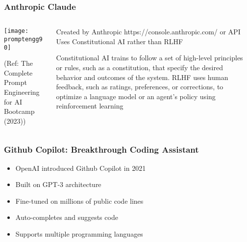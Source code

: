 



\begin{frame}[fragile]\frametitle{Anthropic Claude}


\begin{columns}
    \begin{column}[T]{0.6\linewidth}
		\begin{center}
		\texttt{[image: promptengg90]}

		{\tiny (Ref: The Complete Prompt Engineering for AI Bootcamp (2023))}
		\end{center}	
    \end{column}
    \begin{column}[T]{0.4\linewidth}
		Created by Anthropic 
		https://console.anthropic.com/ or API
		Uses Constitutional AI rather than RLHF
		
		Constitutional AI trains to follow a set of high-level principles or rules, such as a constitution, that specify the desired behavior and outcomes of the system.
		RLHF uses human feedback, such as ratings, preferences, or corrections, to optimize a language model or an agent’s policy using reinforcement learning
    \end{column}
  \end{columns}
\end{frame}

\begin{frame}[fragile]\frametitle{Github Copilot: Breakthrough Coding Assistant}
    
    \begin{itemize}
        \item OpenAI introduced Github Copilot in 2021
        \item Built on GPT-3 architecture
        \item Fine-tuned on millions of public code lines
        \item Auto-completes and suggests code
        \item Supports multiple programming languages
    \end{itemize}
\end{frame}

